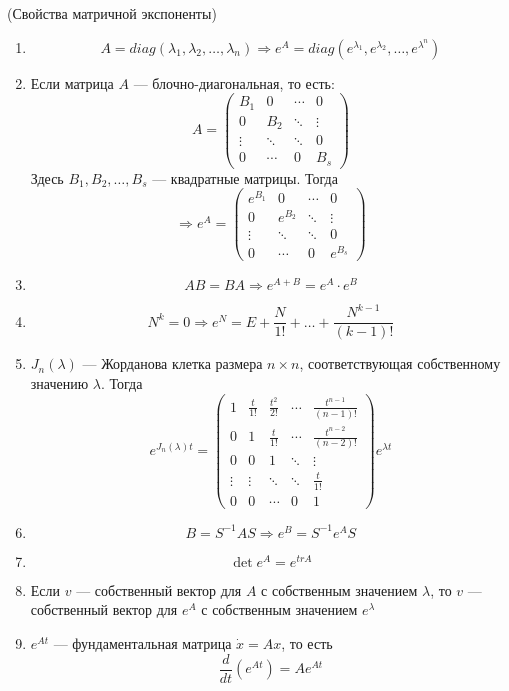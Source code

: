 \documentclass[11pt]{article}
\begin{document}
\begin{theorem}
    (Свойства матричной экспоненты)
    \begin{enumerate}
        \item \[ A = diag (\lambda_1, \lambda_2, \ldots , \lambda_n) \Rightarrow e^A = diag(e^{\lambda_1}, e^{\lambda_2}, \ldots , e^{\lambda^n}) \]   
        \item Если матрица $A$  --- блочно-диагональная, то есть: \[ A =
        \begin{pmatrix}
            \boxed{B_1} & 0 & \cdots & 0 \\
            0 & \boxed{B_2} & \ddots & \vdots \\
            \vdots & \ddots & \ddots & 0 \\
            0 & \cdots & 0 & \boxed{B_s}
        \end{pmatrix} \]
        Здесь $B_1, B_2, \ldots, B_s$ --- квадратные матрицы. Тогда 
        \[ \Rightarrow e^A = 
        \begin{pmatrix}
            \boxed{e^{B_1}} & 0 & \cdots & 0 \\
            0 & \boxed{e^{B_2}} & \ddots & \vdots \\
            \vdots & \ddots & \ddots & 0 \\
            0 & \cdots & 0 & \boxed{e^{B_s}}
        \end{pmatrix} \]
        \item \[ AB = BA \Rightarrow e^{A+B} = e^A \cdot e^B \]  
        \item \[ N^k = 0 \Rightarrow e^N = E + \frac{N}{1!} + \ldots + \frac{N^{k-1}}{(k-1)!} \]   
        \item $J_n(\lambda)$ --- Жорданова клетка размера $n\times n$, соответствующая собственному значению $\lambda$. 
        Тогда
        \[ e^{J_n(\lambda)t} = 
        \begin{pmatrix}
            1 & \frac{t}{1!} & \frac{t^2}{2!} & \cdots
            & \frac{t^{n-1}}{(n-1)!} \\
            0 & 1 & \frac{t}{1!} & \cdots
            & \frac{t^{n-2}}{(n-2)!} \\
            0 & 0 & 1 & \ddots & \vdots \\
            \vdots & \vdots & \ddots & \ddots & \frac{t}{1!} \\
            0 & 0 & \cdots & 0 & 1
        \end{pmatrix} e^{\lambda t}
        \] 
        \item \[ B= S^{-1}AS \Rightarrow e^B = S^{-1} e^A S \] 
        \item \[ \det e^A = e^{tr A} \]  
        \item Если $v$ --- собственный вектор для $A$ с собственным значением $\lambda$, то $v$ --- собственный вектор для $e^A$ с собственным значением $e^{\lambda}$ 
        \item $e^{At}$ --- фундаментальная матрица $\dot{x} = Ax$, то есть 
        \[ \frac{d}{dt} (e^{At}) = Ae^{At} \] 
    \end{enumerate}
\end{theorem}
\end{document}
